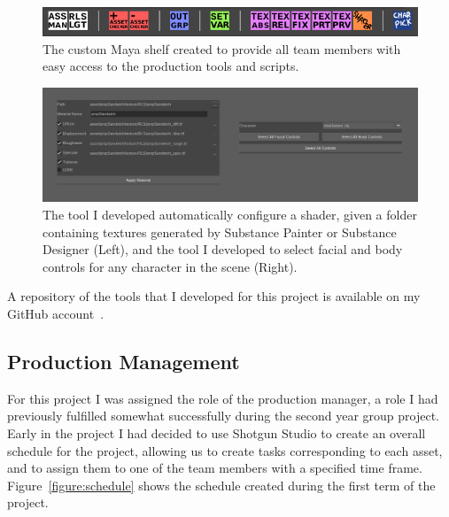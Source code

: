 \documentclass[11pt]{article}
\begin{document}
\begin{figure}[htbp]
\centering
\includegraphics[width=1.0\linewidth]{images/shelf.png}
\caption{\label{figure:shelf} The custom Maya shelf created to provide all team members with easy access to the production tools and scripts.}
\end{figure}

\begin{figure}[htbp]
\centering
\includegraphics[width=1.0\linewidth]{images/miscScripts.png}
\caption{\label{figure:miscScripts} The tool I developed automatically configure a shader, given a folder containing textures generated by Substance Painter or Substance Designer (Left), and the tool I developed to select facial and body controls for any character in the scene (Right).}
\end{figure}

A repository of the tools that I developed for this project is available on my GitHub account~\cite{myGitHub}.

\subsection{Production Management} \label{productionManagement}

For this project I was assigned the role of the production manager, a role I had previously fulfilled somewhat successfully during the second year group project. Early in the project I had decided to use Shotgun Studio to create an overall schedule for the project, allowing us to create tasks corresponding to each asset, and to assign them to one of the team members with a specified time frame. Figure~\ref{figure:schedule} shows the schedule created during the first term of the project.
\end{document}
